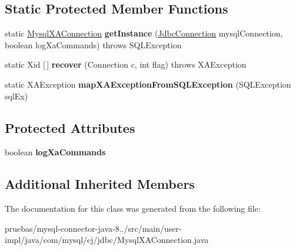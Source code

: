 \subsection*{Static Protected Member Functions}
\begin{DoxyCompactItemize}
\item 
\mbox{\label{classcom_1_1mysql_1_1cj_1_1jdbc_1_1_mysql_x_a_connection_a66a8ed0f398150a2042c39f56befe824}} 
static \mbox{\hyperlink{classcom_1_1mysql_1_1cj_1_1jdbc_1_1_mysql_x_a_connection}{Mysql\+X\+A\+Connection}} {\bfseries get\+Instance} (\mbox{\hyperlink{interfacecom_1_1mysql_1_1cj_1_1jdbc_1_1_jdbc_connection}{Jdbc\+Connection}} mysql\+Connection, boolean log\+Xa\+Commands)  throws S\+Q\+L\+Exception 
\item 
\mbox{\label{classcom_1_1mysql_1_1cj_1_1jdbc_1_1_mysql_x_a_connection_af6946cf76a2c471c7fefa2ec712b4994}} 
static Xid \mbox{[}$\,$\mbox{]} {\bfseries recover} (Connection c, int flag)  throws X\+A\+Exception 
\item 
\mbox{\label{classcom_1_1mysql_1_1cj_1_1jdbc_1_1_mysql_x_a_connection_a6be66ae9e7a01d3cabda0e0a55d66514}} 
static X\+A\+Exception {\bfseries map\+X\+A\+Exception\+From\+S\+Q\+L\+Exception} (S\+Q\+L\+Exception sql\+Ex)
\end{DoxyCompactItemize}
\subsection*{Protected Attributes}
\begin{DoxyCompactItemize}
\item 
\mbox{\label{classcom_1_1mysql_1_1cj_1_1jdbc_1_1_mysql_x_a_connection_a9e3e1df1f4dee55cf52612e8fe85eabf}} 
boolean {\bfseries log\+Xa\+Commands}
\end{DoxyCompactItemize}
\subsection*{Additional Inherited Members}


The documentation for this class was generated from the following file\+:\begin{DoxyCompactItemize}
\item 
pruebas/mysql-\/connector-\/java-\/8../src/main/user-\/impl/java/com/mysql/cj/jdbc/Mysql\+X\+A\+Connection.\+java\end{DoxyCompactItemize}
